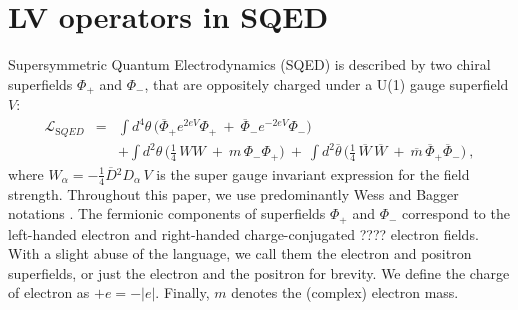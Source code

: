 \documentclass[12pt]{revtex4}
\begin{document}
\section{LV operators in SQED} 
\label{LVoperators}

Supersymmetric Quantum Electrodynamics (SQED) is described
by two chiral superfields $ \Phi_+ $ and $ \Phi_- $, that 
are oppositely charged under a U(1) gauge superfield $ V $: 
\begin{eqnarray}
\mathcal{L}_{\mathrm SQED} & =
&
\int d^4\theta\, \Big(
   \overline{\Phi}_+ e^{2eV} \Phi_+ ~+~
   \overline{\Phi}_- e^{-2eV} {\Phi}_-  \Big) \\
\label{SQED}
&& + 
\int d^2\theta\, \Big( \frac{1}{4}\,  WW ~+~m\, \Phi_-\Phi_+ \Big) ~+~
\int d^2\overline{\theta}\, 
\Big( \frac{1}{4}\, \overline{W}\,\overline{W} ~+~ 
\overline{m}\, \overline{\Phi}_+\overline{\Phi}_- \Big)~, 
\nonumber
\end{eqnarray}
where $ W_\alpha = - \frac{1}{4} \overline{D}{}^2 D_\alpha\, {V} $ 
is the super gauge invariant expression for the field strength. 
Throughout this paper, we use predominantly Wess and
Bagger notations \cite{Wess:1992cp}. The fermionic components of
superfields $ \Phi_+ $ and $ \Phi_- $ correspond to the left-handed
electron and right-handed charge-conjugated ???? electron fields. With a   
slight abuse of the language, we call them the electron and positron 
superfields, or just the electron and the positron for brevity. We
define the charge of electron as $ + e = - | e | $. 
Finally, $ m $ denotes the (complex) electron mass. 
\end{document}
